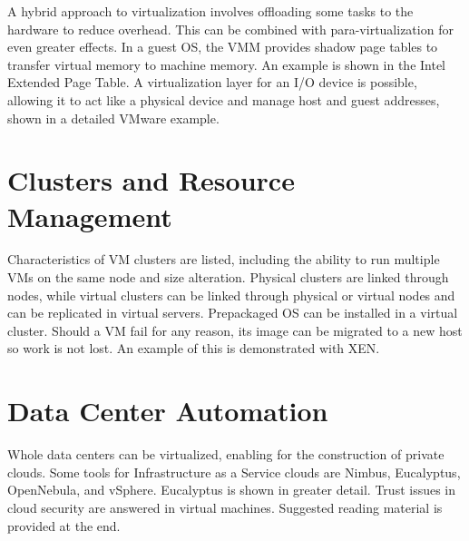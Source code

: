 A hybrid approach to virtualization involves offloading some tasks to
the hardware to reduce overhead. This can be combined with
para-virtualization for even greater effects. In a guest OS, the VMM
provides shadow page tables to transfer virtual memory to machine
memory. An example is shown in the Intel Extended Page Table. A
virtualization layer for an I/O device is possible, allowing it to act
like a physical device and manage host and guest addresses, shown in a
detailed VMware example.




\section{Clusters and Resource Management}

Characteristics of VM clusters are listed, including the ability to run
multiple VMs on the same node and size alteration. Physical clusters are
linked through nodes, while virtual clusters can be linked through
physical or virtual nodes and can be replicated in virtual servers.
Prepackaged OS can be installed in a virtual cluster. Should a VM fail
for any reason, its image can be migrated to a new host so work is not
lost. An example of this is demonstrated with XEN.




\section{Data Center Automation}

Whole data centers can be virtualized, enabling for the construction of
private clouds. Some tools for Infrastructure as a Service clouds are
Nimbus, Eucalyptus, OpenNebula, and vSphere. Eucalyptus is shown in
greater detail. Trust issues in cloud security are answered in virtual
machines. Suggested reading material is provided at the end.

